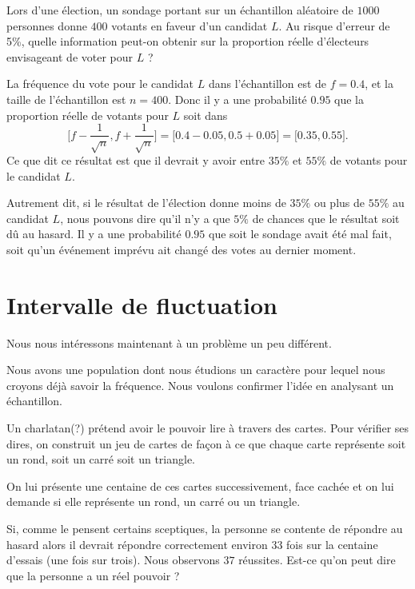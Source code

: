 \begin{example}
Lors d’une élection, un sondage portant sur un échantillon aléatoire de $1000$ personnes donne $400$ votants en faveur d’un candidat \( L\). Au risque d’erreur de 5\%, quelle information peut-on obtenir sur la proportion réelle d’électeurs envisageant de voter pour $L$ ?    

La fréquence du vote pour le candidat \( L\) dans l'échantillon est de \( f=0.4\), et la taille de l'échantillon est \( n=400\). Donc il y a une probabilité \( 0.95\) que la proportion réelle de votants pour \( L\) soit dans
\begin{equation}
    \mathopen[ f-\frac{1}{ \sqrt{n} } , f+\frac{1}{ \sqrt{n} } \mathclose]=\mathopen[ 0.4-0.05 , 0.5+0.05 \mathclose]=\mathopen[ 0.35 , 0.55 \mathclose].
\end{equation}
Ce que dit ce résultat est que il devrait y avoir entre \( 35\%\) et \( 55\%\) de votants pour le candidat \( L\).

Autrement dit, si le résultat de l'élection donne moins de \( 35\%\) ou plus de \( 55\%\) au candidat \( L\), nous pouvons dire qu'il n'y a que \( 5\%\) de chances que le résultat soit dû au hasard. Il y a une probabilité \( 0.95\) que soit le sondage avait été mal fait, soit qu'un événement imprévu ait changé des votes au dernier moment.

\end{example}

\section{Intervalle de fluctuation}

Nous nous intéressons maintenant à un problème un peu différent.

Nous avons une population dont nous étudions un caractère pour lequel nous croyons déjà savoir la fréquence. Nous voulons confirmer l'idée en analysant un échantillon.

\begin{example}
    Un charlatan(?) prétend avoir le pouvoir lire à travers des cartes. Pour vérifier ses dires, on construit un jeu de cartes de façon à ce que chaque carte représente soit un rond, soit un carré soit un triangle.

    On lui présente une centaine de ces cartes successivement, face cachée et on lui demande si elle représente un rond, un carré ou un triangle.

    Si, comme le pensent certains sceptiques, la personne se contente de répondre au hasard alors il devrait répondre correctement environ \( 33\) fois sur la centaine d'essais (une fois sur trois). Nous observons \( 37\) réussites. Est-ce qu'on peut dire que la personne a un réel pouvoir ?

\end{example}

